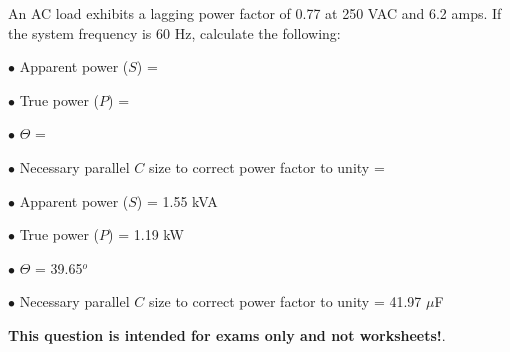 

An AC load exhibits a lagging power factor of 0.77 at 250 VAC and 6.2 amps.  If the system frequency is 60 Hz, calculate the following:

\medskip
\item{$\bullet$} Apparent power ($S$) =
\item{$\bullet$} True power ($P$) =
\item{$\bullet$} $\Theta$ =
\item{$\bullet$} Necessary parallel $C$ size to correct power factor to unity = 
\medskip







\medskip
\goodbreak
\item{$\bullet$} Apparent power ($S$) = 1.55 kVA
\item{$\bullet$} True power ($P$) = 1.19 kW
\item{$\bullet$} $\Theta$ = 39.65$^{o}$
\item{$\bullet$} Necessary parallel $C$ size to correct power factor to unity = 41.97 $\mu$F
\medskip







{\bf This question is intended for exams only and not worksheets!}.



